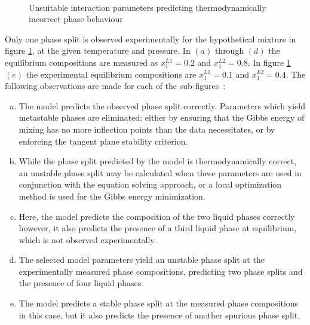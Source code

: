 \begin{figure}[t]
\begin{center}
\resizebox{0.5\textwidth}{!}{}\\
\end{center}
\caption{Unsuitable interaction parameters predicting thermodynamically incorrect phase behaviour} \label{IncorrectParamDrawing}
\end{figure}	

Only one phase split is observed experimentally for the hypothetical mixture in figure \ref{IncorrectParamDrawing}, at the given temperature and pressure. In $\left(a\right)$ through $\left(d\right)$ the equilibrium compositions are measured as $x_{1}^{L1} = 0.2$ and $x_{1}^{L2} = 0.8$. In figure \ref{IncorrectParamDrawing} $\left(e\right)$ the experimental equilibrium compositions are $x_{1}^{L1} = 0.1$ and $x_{1}^{L2} = 0.4$. The following observations are made for each of the sub-figures~\cite{BilevelOptimization2}:\

\begin{enumerate}[(a)]
\item The model predicts the observed phase split correctly. Parameters which yield metastable phases are eliminated; either by ensuring that the Gibbs energy of mixing has no more inflection points than the data necessitates, or by enforcing the tangent plane stability criterion.\
\item While the phase split predicted by the model is thermodynamically correct, an unstable phase split may be calculated when these parameters are used in conjunction with the equation solving approach, or a local optimization method is used for the Gibbs energy minimization.\
\item Here, the model predicts the composition of the two liquid phases correctly however, it also predicts the presence of a third liquid phase at equilibrium, which is not observed experimentally.\
\item The selected model parameters yield an unstable phase split at the experimentally measured phase compositions, predicting two phase splits and the presence of four liquid phases.\
\item The model predicts a stable phase split at the measured phase compositions in this case, but it also predicts the presence of another spurious phase split.
\end{enumerate}

